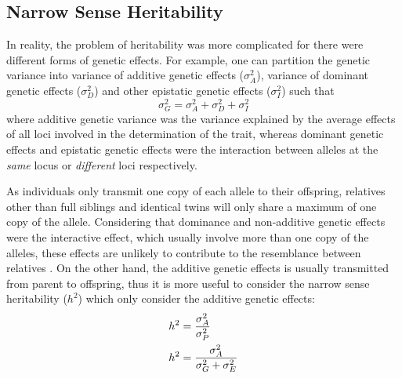 	\subsection{Narrow Sense Heritability}
	In reality, the problem of heritability was more complicated for there were different forms of genetic effects. 
	For example, one can partition the genetic variance into variance of additive genetic effects ($\sigma_A^2$), variance of dominant genetic effects ($\sigma_D^2$) and other epistatic genetic effects ($\sigma_I^2$) such that
	$$
	\sigma_G^2=\sigma_A^2+\sigma_D^2+\sigma_I^2
	$$
	where additive genetic variance was the variance explained by the average effects of all loci involved in the determination of the trait, whereas dominant genetic effects and epistatic genetic effects were the interaction between alleles at the \emph{same} locus or \emph{different} loci respectively.
	
	As individuals only transmit one copy of each allele to their offspring, relatives other than full siblings and identical twins will only share a maximum of one copy of the allele.
	Considering that dominance and non-additive genetic effects were the interactive effect, which usually involve more than one copy of the alleles, these effects are unlikely to contribute to the resemblance between relatives \citep{Visscher2008}.
	On the other hand, the additive genetic effects is usually transmitted from parent to offspring, thus it is more useful to consider the narrow sense heritability ($h^2$) which only consider the additive genetic effects:
	\begin{align}
	h^2&=\frac{\sigma_A^2}{\sigma_P^2} \notag\\
	h^2&=\frac{\sigma_A^2}{\sigma_G^2+\sigma_E^2}
	\label{eq:narrowHeritability}
	\end{align}
	
